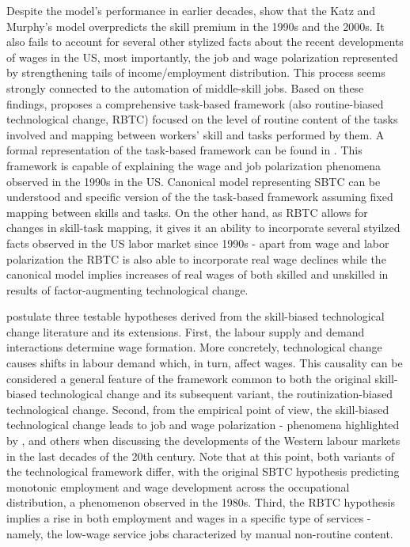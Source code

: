\documentclass[11pt]{article}
\begin{document}
Despite the model's performance in earlier decades, \citet{acemoglu2011skills} show that the Katz and Murphy's model overpredicts the skill premium in the 1990s and the 2000s. It also fails to account for several other stylized facts about the recent developments of wages in the US, most importantly, the job and wage polarization represented by strengthening tails of income/employment distribution. This process seems strongly connected to the automation of middle-skill jobs. Based on these findings, \citet{acemoglu2012does} proposes a comprehensive task-based framework (also routine-biased technological change, RBTC) focused on the level of routine content of the tasks involved and mapping between workers' skill and tasks performed by them. A formal representation of the task-based framework can be found in \citet{acemoglu2011skills}. This framework is capable of explaining the wage and job polarization phenomena observed in the 1990s in the US. 
Canonical model representing SBTC can be understood and specific version of the the task-based framework assuming fixed mapping between skills and tasks.
On the other hand, as RBTC allows for changes in skill-task mapping, it gives it an ability to incorporate several styilzed facts observed in the US labor market since 1990s - apart from wage and labor polarization the RBTC is also able to incorporate real wage declines while the canonical model implies increases of real wages of both skilled and unskilled in results of factor-augmenting technological change.

\citet{mishel2013assessing} postulate three testable hypotheses derived from the skill-biased technological change literature and its extensions. First, the labour supply and demand interactions determine wage formation. More concretely, technological change causes shifts in labour demand which, in turn, affect wages. This causality can be considered a general feature of the framework common to both the original skill-biased technological change and its subsequent variant, the routinization-biased technological change. Second, from the empirical point of view, the skill-biased technological change leads to job and wage polarization - phenomena highlighted by \citet{acemoglu2012does}, \citet{howell2019declining} and others when discussing the developments of the Western labour markets in the last decades of the 20th century. Note that at this point, both variants of the technological framework differ, with the original SBTC hypothesis predicting monotonic employment and wage development across the occupational distribution, a phenomenon observed in the 1980s. Third, the RBTC hypothesis implies a rise in both employment and wages in a specific type of services - namely, the low-wage service jobs characterized by manual non-routine content.
\end{document}

